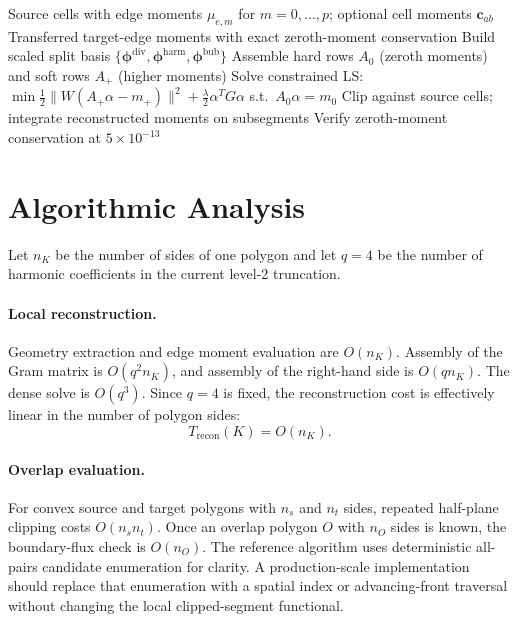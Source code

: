 \documentclass[11pt]{article}
\begin{document}
\begin{algorithm}[t]
\caption{High-Order Projected Edge-Moment Transfer}
\label{alg:high-order-transfer}
\begin{algorithmic}[1]
\REQUIRE Source cells with edge moments \(\mu_{e,m}\) for \(m = 0,\ldots,p\); optional cell moments \(\mathbf{c}_{ab}\)
\ENSURE  Transferred target-edge moments with exact zeroth-moment conservation
  \STATE Build scaled split basis \(\{\boldsymbol{\phi}^{\mathrm{div}}, \boldsymbol{\phi}^{\mathrm{harm}}, \boldsymbol{\phi}^{\mathrm{bub}}\}\) \hfill{}
  \STATE Assemble hard rows \(A_0\) (zeroth moments) and soft rows \(A_+\) (higher moments)
  \STATE Solve constrained LS: \(\min \tfrac{1}{2}\|W(A_+\alpha - m_+)\|^2 + \tfrac{\lambda}{2}\alpha^T G \alpha\) s.t.\ \(A_0 \alpha = m_0\) \hfill{}
\ENDFOR
{}
  \STATE Clip against source cells; integrate reconstructed moments on subsegments
\ENDFOR
\STATE Verify zeroth-moment conservation at \(5\times10^{-13}\)
\end{algorithmic}
\end{algorithm}

\section{Algorithmic Analysis}

Let \(n_K\) be the number of sides of one polygon and let \(q=4\) be the number
of harmonic coefficients in the current level-2 truncation.

\paragraph{Local reconstruction.}
Geometry extraction and edge moment evaluation are \(O(n_K)\).  Assembly of
the Gram matrix is \(O(q^2 n_K)\), and assembly of the right-hand side is
\(O(q n_K)\).  The dense solve is \(O(q^3)\).  Since \(q=4\) is fixed, the
reconstruction cost is effectively linear in the number of polygon sides:
\[
  T_{\mathrm{recon}}(K)=O(n_K).
\]

\paragraph{Overlap evaluation.}
For convex source and target polygons with \(n_s\) and \(n_t\) sides, repeated
half-plane clipping costs \(O(n_s n_t)\).  Once an overlap polygon \(O\) with
\(n_O\) sides is known, the boundary-flux check is \(O(n_O)\).  The reference
algorithm uses deterministic all-pairs candidate enumeration for clarity.  A
production-scale implementation should replace that enumeration with a spatial
index or advancing-front traversal without changing the local clipped-segment
functional.
\end{document}
